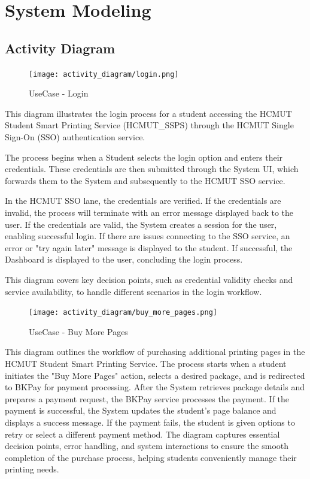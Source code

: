 \chapter{System Modeling}
\section{Activity Diagram}

\begin{figure}[H]
    \centering
    \texttt{[image: activity\_diagram/login.png]}
    \caption{UseCase - Login}
\end{figure}

This diagram illustrates the login process for a student accessing the HCMUT Student Smart Printing Service (HCMUT\_SSPS) through the HCMUT Single Sign-On (SSO) authentication service.

The process begins when a Student selects the login option and enters their credentials. These credentials are then submitted through the System UI, which forwards them to the System and subsequently to the HCMUT SSO service.

In the HCMUT SSO lane, the credentials are verified. If the credentials are invalid, the process will terminate with an error message displayed back to the user. If the credentials are valid, the System creates a session for the user, enabling successful login. If there are issues connecting to the SSO service, an error or "try again later" message is displayed to the student. If successful, the Dashboard is displayed to the user, concluding the login process.

This diagram covers key decision points, such as credential validity checks and service availability, to handle different scenarios in the login workflow.

\begin{figure}[H]
    \centering
    \texttt{[image: activity\_diagram/buy\_more\_pages.png]}
    \caption{UseCase - Buy More Pages}
\end{figure}
This diagram outlines the workflow of purchasing additional printing pages in the HCMUT Student Smart Printing Service. The process starts when a student initiates the "Buy More Pages" action, selects a desired package, and is redirected to BKPay for payment processing. After the System retrieves package details and prepares a payment request, the BKPay service processes the payment. If the payment is successful, the System updates the student’s page balance and displays a success message. If the payment fails, the student is given options to retry or select a different payment method. The diagram captures essential decision points, error handling, and system interactions to ensure the smooth completion of the purchase process, helping students conveniently manage their printing needs.

